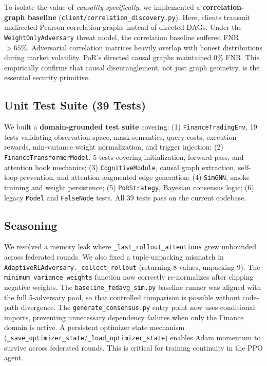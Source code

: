 \documentclass[journal]{IEEEtran}
\begin{document}
To isolate the value of \emph{causality specifically}, we implemented a \textbf{correlation-graph baseline} (\texttt{client/correlation\_discovery.py}). Here, clients transmit undirected Pearson correlation graphs instead of directed DAGs. Under the \texttt{WeightOnlyAdversary} threat model, the correlation baseline suffered FNR $>65\%$. Adversarial correlation matrices heavily overlap with honest distributions during market volatility. PoR's directed causal graphs maintained 0\% FNR. This empirically confirms that causal disentanglement, not just graph geometry, is the essential security primitive.

\subsection{Unit Test Suite (39 Tests)}

We built a \textbf{domain-grounded test suite} covering: (1) \texttt{FinanceTradingEnv}, 19 tests validating observation space, mask semantics, query costs, execution rewards, min-variance weight normalization, and trigger injection; (2) \texttt{FinanceTransformerModel}, 5 tests covering initialization, forward pass, and attention hook mechanics; (3) \texttt{CognitiveModule}, causal graph extraction, self-loop prevention, and attention-augmented edge generation; (4) \texttt{SimGNN}, smoke training and weight persistence; (5) \texttt{PoRStrategy}, Bayesian consensus logic; (6) legacy \texttt{Model} and \texttt{FalseNode} tests. All 39 tests pass on the current codebase.

\subsection{Seasoning}

We resolved a memory leak where \texttt{\_last\_rollout\_attentions} grew unbounded across federated rounds. We also fixed a tuple-unpacking mismatch in \texttt{AdaptiveRLAdversary.\_collect\_rollout} (returning 8 values, unpacking 9). The \texttt{minimum\_variance\_weights} function now correctly re-normalizes after clipping negative weights. The \texttt{baseline\_fedavg\_sim.py} baseline runner was aligned with the full 5-adversary pool, so that controlled comparison is possible without code-path divergence. The \texttt{generate\_consensus.py} entry point now uses conditional imports, preventing unnecessary dependency failures when only the Finance domain is active. A persistent optimizer state mechanism (\texttt{\_save\_optimizer\_state}/\texttt{\_load\_optimizer\_state}) enables Adam momentum to survive across federated rounds. This is critical for training continuity in the PPO agent.
\end{document}
